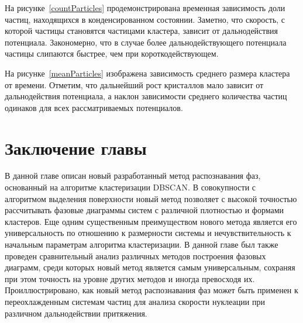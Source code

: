 На рисунке~\ref{countParticles} продемонстрирована временная зависимость доли частиц, находящихся в конденсированном состоянии.
Заметно, что скорость, с которой частицы становятся частицами кластера, зависит от дальнодействия потенциала.
Закономерно, что в случае более дальнодействующего потенциала частицы слипаются быстрее, чем при короткодействующем.


На рисунке~\ref{meanParticles} изображена зависимость среднего размера кластера от времени.
Отметим, что дальнейший рост кристаллов мало зависит от дальнодействия потенциала, а наклон зависимости среднего количества частиц одинаков для всех рассматриваемых потенциалов.


\section{Заключение главы}
\label{PRIMe-SecConclusions}

В данной главе описан новый разработанный метод распознавания фаз, основанный на алгоритме кластеризации DBSCAN.
В совокупности с алгоритмом выделения поверхности новый метод позволяет с высокой точностью рассчитывать фазовые диаграммы систем с различной плотностью и формами кластеров.
Еще одним существенным преимуществом нового метода является его универсальность по отношению к размерности системы и нечувствительность к начальным параметрам алгоритма кластеризации.
В данной главе был также проведен сравнительный анализ различных методов построения фазовых диаграмм, среди которых новый метод является самым универсальным, сохраняя при этом точность на уровне других методов и иногда превосходя их.
Проиллюстрировано, как новый метод распознавания фаз может быть применен к переохлажденным системам частиц для анализа скорости нуклеации при различном дальнодействии притяжения.
